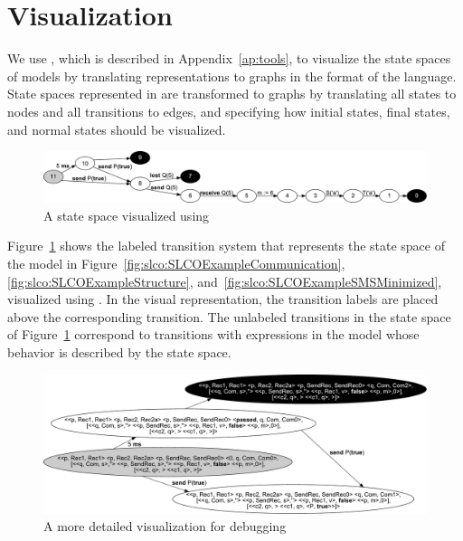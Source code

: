 \section{Visualization}
\label{sec:prototype-semantics:visualization}
We use \DOT, which is described in Appendix~\ref{ap:tools}, to visualize the state spaces of \SLCO models by translating \LTS representations to graphs in the format of the \DOT language.
State spaces represented in \LTS are transformed to \DOT graphs by translating all states to nodes and all transitions to edges, and specifying how initial states, final states, and normal states should be visualized.

\begin{figure}[hbt]
  \centering
  \includegraphics[scale=.36]{prototype-semantics/figs/statespace-orig}
  \caption{A state space visualized using \DOT}
  \label{fig:prototype-semantics:statespace}
\end{figure}

Figure~\ref{fig:prototype-semantics:statespace} shows the labeled transition system that represents the state space of the model in Figure~\ref{fig:slco:SLCOExampleCommunication}, \ref{fig:slco:SLCOExampleStructure}, and~\ref{fig:slco:SLCOExampleSMSMinimized}, visualized using \DOT.
In the visual representation, the transition labels are placed above the corresponding transition.
The unlabeled transitions in the state space of Figure~\ref{fig:prototype-semantics:statespace} correspond to transitions with expressions in the \SLCO model whose behavior is described by the state space.

\begin{figure}[hbt]
  \centering
  \includegraphics[scale=.36]{prototype-semantics/figs/debug}
  \caption{A more detailed visualization for debugging}
  \label{fig:prototype-semantics:debug-statespace}
\end{figure}


